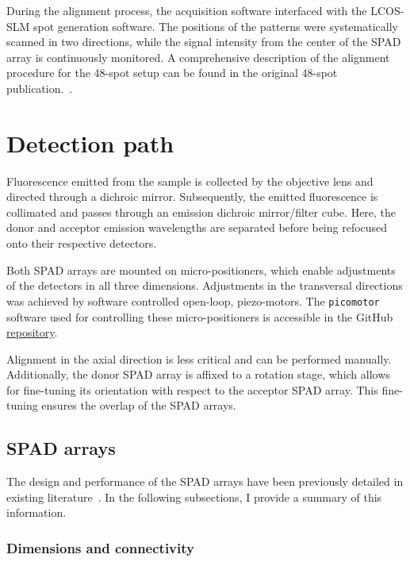 During the alignment process, the acquisition software interfaced with the \ac{LCOS-SLM} spot generation software. 
The positions of the patterns were systematically scanned in two directions, while the signal intensity from the center of the \ac{SPAD} array is continuously monitored. 
A comprehensive description of the alignment procedure for the 48-spot setup can be found in the original 48-spot publication.~\cite{ingargiola_JCP_2018}.

\section{Detection path}
\label{sec:detection_path}

Fluorescence emitted from the sample is collected by the objective lens and directed through a dichroic mirror. 
Subsequently, the emitted fluorescence is collimated and passes through an emission dichroic mirror/filter cube. 
Here, the donor and acceptor emission wavelengths are separated before being refocused onto their respective detectors.

Both \ac{SPAD} arrays are mounted on micro-positioners, which enable adjustments of the detectors in all three dimensions. 
Adjustments in the transversal directions was achieved by software controlled open-loop, piezo-motors. 
The \texttt{picomotor} software used for controlling these micro-positioners is accessible in the GitHub \href{https://github.com/tritemio/picomotor}{repository}.

Alignment in the axial direction is less critical and can be performed manually. 
Additionally, the donor \ac{SPAD} array is affixed to a rotation stage, which allows for fine-tuning its orientation with respect to the acceptor \ac{SPAD} array. 
This fine-tuning ensures the overlap of the \ac{SPAD} arrays.

\subsection{SPAD arrays}
\label{sec:SPADs}

The design and performance of the \ac{SPAD} arrays have been previously detailed in existing literature~\cite{gulinatti_SPIE_2013, ingargiola_JCP_2018}. 
In the following subsections, I provide a summary of this information.

\subsubsection{Dimensions and connectivity}

